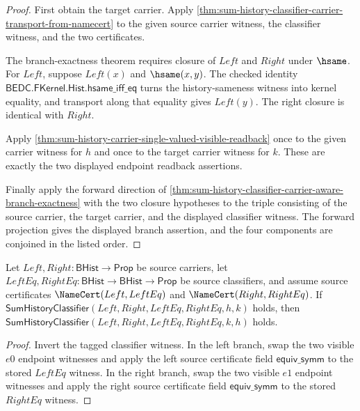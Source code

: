 \begin{proof}
First obtain the target carrier. Apply
\autoref{thm:sum-history-classifier-carrier-transport-from-namecert} to the
given source carrier witness, the classifier witness, and the two certificates.

The branch-exactness theorem requires closure of $Left$ and $Right$ under
$\hsame$. For $Left$, suppose $Left(x)$ and $\hsame(x,y)$. The checked identity
$\mathsf{BEDC.FKernel.Hist.hsame\_iff\_eq}$ turns the history-sameness witness
into kernel equality, and transport along that equality gives $Left(y)$. The
right closure is identical with $Right$.

Apply \autoref{thm:sum-history-carrier-single-valued-visible-readback} once to
the given carrier witness for $h$ and once to the target carrier witness for
$k$. These are exactly the two displayed endpoint readback assertions.

Finally apply the forward direction of
\autoref{thm:sum-history-classifier-carrier-aware-branch-exactness} with the two
closure hypotheses to the triple consisting of the source carrier, the target
carrier, and the displayed classifier witness. The forward projection gives the
displayed branch assertion, and the four components are conjoined in the listed
order.
\end{proof}

\begin{theorem}
\label{thm:sum-history-classifier-symm-from-namecert}
Let $Left,Right:\mathsf{BHist}\to\mathsf{Prop}$ be source carriers, let
$LeftEq,RightEq:\mathsf{BHist}\to\mathsf{BHist}\to\mathsf{Prop}$ be source
classifiers, and assume source certificates $\NameCert(Left,LeftEq)$ and
$\NameCert(Right,RightEq)$. If
$\mathsf{SumHistoryClassifier}(Left,Right,LeftEq,RightEq,h,k)$ holds, then
$\mathsf{SumHistoryClassifier}(Left,Right,LeftEq,RightEq,k,h)$ holds.
\end{theorem}
\begin{proof}
Invert the tagged classifier witness. In the left branch, swap the two visible
$e0$ endpoint witnesses and apply the left source certificate field
$\mathsf{equiv\_symm}$ to the stored $LeftEq$ witness. In the right branch,
swap the two visible $e1$ endpoint witnesses and apply the right source
certificate field $\mathsf{equiv\_symm}$ to the stored $RightEq$ witness.
\end{proof}

